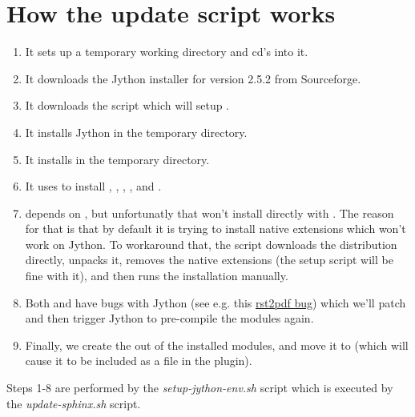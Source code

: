 \documentclass[letterpaper,10pt,english]{sphinxmanual}
\begin{document}
\section{How the update script works}
\label{development:how-the-update-script-works}\begin{enumerate}
\item {} 
It sets up a temporary working directory  and cd's into it.

\item {} 
It downloads the Jython installer for version 2.5.2 from Sourceforge.

\item {} 
It downloads the  script which will setup .

\item {} 
It installs Jython in the temporary directory.

\item {} 
It installs  in the temporary directory.

\item {} 
It uses  to install , , , , and .

\item {} 
 depends on , but unfortunatly that won't install
directly with . The reason for that is that by default it is
trying to install native extensions which won't work on Jython. To workaround
that, the script downloads the  distribution directly, unpacks it,
removes the native extensions (the setup script will be fine with it), and then
runs the installation manually.

\item {} 
Both  and  have bugs with Jython (see e.g. this \href{https://code.google.com/p/rst2pdf/issues/detail?id=458}{rst2pdf bug}) which
we'll patch and then trigger Jython to pre-compile the modules again.

\item {} 
Finally, we create the  out of the installed modules, and move it to
 (which will cause it to be included as a file in the plugin).

\end{enumerate}

Steps 1-8 are performed by the \emph{setup-jython-env.sh} script which is executed by
the \emph{update-sphinx.sh} script.
\end{document}
